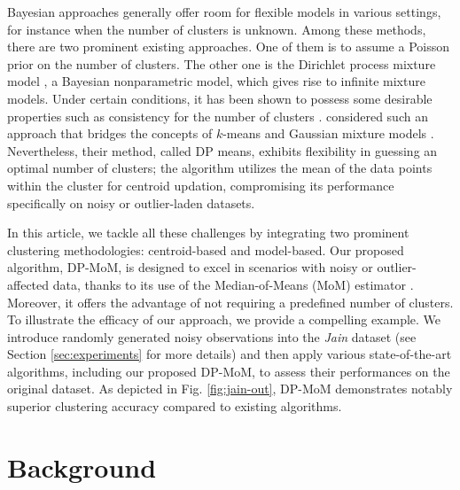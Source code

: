 \documentclass{article}
\begin{document}
Bayesian approaches generally offer room for flexible models in various settings, for instance when the number of clusters is unknown. Among these methods, there are two prominent existing approaches. One of them is to assume a Poisson prior on the number of clusters. The  other one is the Dirichlet process mixture model \citep{hjort_holmes_müller_walker_2010}, a Bayesian nonparametric model, which gives rise to infinite mixture models. Under certain conditions, it has been shown to possess some desirable properties such as consistency for the number of clusters \citep{ascolani-DP}. \citet{DP-Means} considered such an approach that bridges the concepts of $k$-means and Gaussian mixture models \citep{murphy2018machine}. Nevertheless, their method, called DP means, exhibits flexibility in guessing an optimal number of clusters; the algorithm utilizes the mean of the data points within the cluster for centroid updation, compromising its performance specifically on noisy or outlier-laden datasets.


In this article, we tackle all these challenges by integrating two prominent clustering methodologies: centroid-based and model-based. Our proposed algorithm, DP-MoM, is designed to excel in scenarios with noisy or outlier-affected data, thanks to its use of the Median-of-Means (MoM) estimator \citep{nemirovsky1983wiley,devroye-MoM}. Moreover, it offers the advantage of not requiring a predefined number of clusters. To illustrate the efficacy of our approach, we provide a compelling example. We introduce randomly generated noisy observations into the \textit{Jain} dataset \citep{jain-dataset} (see Section \ref{sec:experiments} for more details) and then apply various state-of-the-art algorithms, including our proposed DP-MoM, to assess their performances on the original dataset. As depicted in Fig. \ref{fig:jain-out}, DP-MoM demonstrates notably superior clustering accuracy compared to existing algorithms.

\section{Background}
\label{gen_inst}
\end{document}
